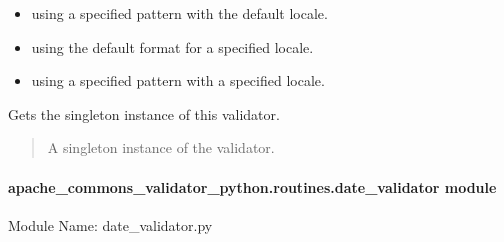 \documentclass[letterpaper,10pt,english]{sphinxmanual}
\begin{document}
\begin{fulllineitems}
\begin{itemize}
\item {} 
\sphinxAtStartPar
using a specified pattern with the default locale.

\item {} 
\sphinxAtStartPar
using the default format for a specified locale.

\item {} 
\sphinxAtStartPar
using a specified pattern with a specified locale.

\end{itemize}

\begin{fulllineitems}
\label{\detokenize{apache_commons_validator_python.routines:apache_commons_validator_python.routines.currency_validator.CurrencyValidator.get_instance}}
\pysigstartsignatures
{}
\pysigstopsignatures
\sphinxAtStartPar
Gets the singleton instance of this validator.
\begin{quote}\begin{description}
\sphinxAtStartPar
A singleton instance of the validator.

\end{description}\end{quote}

\end{fulllineitems}


\end{fulllineitems}



\paragraph{apache\_commons\_validator\_python.routines.date\_validator module}
\label{\detokenize{apache_commons_validator_python.routines:module-apache_commons_validator_python.routines.date_validator}}\label{\detokenize{apache_commons_validator_python.routines:apache-commons-validator-python-routines-date-validator-module}}
\sphinxAtStartPar
Module Name: date\_validator.py
\end{document}
